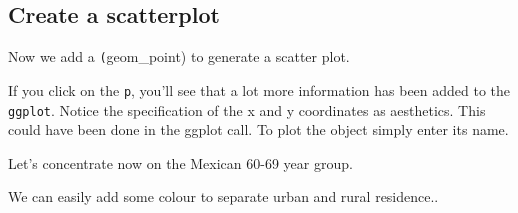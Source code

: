 \documentclass[titlepage]{book}\usepackage{knitr}
\begin{document}
\subsection{Create a scatterplot}  

Now we add a \texttt(geom\_point) to generate a scatter plot.
\begin{knitrout}
\color{fgcolor}\begin{kframe}
\begin{alltt}
 \hlkwb{<-}  \hlopt{+} \hlstd{(}\hlstd{(}   
\end{alltt}
\end{kframe}
\end{knitrout}
 If you click on the \texttt{p}, you'll see that a lot more information has been added to the \texttt{ggplot}.  Notice the specification of the x and y coordinates as aesthetics.  This could have been done in the ggplot call.  To plot the object simply enter its name.
 
\begin{knitrout}
\color{fgcolor}\begin{kframe}
\begin{alltt}
\end{alltt}
\end{kframe}
\end{knitrout}

Let's concentrate now on the Mexican  60-69 year group.

\begin{knitrout}
\color{fgcolor}\begin{kframe}
\begin{alltt}
 \hlkwb{<-}  \hlopt{==}\hlopt{==}\hlstd{)}
\end{alltt}
\end{kframe}
\end{knitrout}

We can easily add some colour to separate urban and rural residence..

\begin{knitrout}
\color{fgcolor}\begin{kframe}
\begin{alltt}
 \hlkwb{<-}  \hlopt{+}
  \hlstd{(}\hlstd{(}      \hlstd{=} \hlstd{)}
\end{alltt}
\end{kframe}
\end{knitrout}
\end{document}
